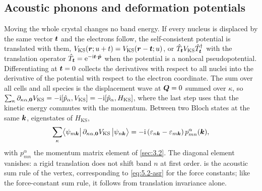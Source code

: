 \subsection{Acoustic phonons and deformation potentials}

Moving the whole crystal changes no band energy. If every nucleus is displaced by the same vector $\bm{t}$ and the electrons follow, the self-consistent potential is translated with them, $V_{\mathrm{KS}}(\bm{r};u + t) = V_{\mathrm{KS}}(\bm{r} - \bm{t};u)$, or $\hat{T}_{\bm{t}}V_{\mathrm{KS}}\hat{T}^\dagger_{\bm{t}}$ with the translation operator $\hat{T}_{\bm{t}} = \mathrm{e}^{-\mathrm{i}\bm{t}\cdot\hat{\bm{p}}}$ when the potential is a nonlocal pseudopotential. Differentiating at $\bm{t} = 0$ collects the derivatives with respect to all nuclei into the derivative of the potential with respect to the electron coordinate. The sum over all cells and all species is the displacement wave at $\bm{Q} = 0$ summed over $\kappa$, so $\sum_\kappa\partial_{\kappa\alpha,\bm{0}}V_{\mathrm{KS}} = -\mathrm{i}[\hat{p}_\alpha, V_{\mathrm{KS}}] = -\mathrm{i}[\hat{p}_\alpha, H_{\mathrm{KS}}]$, where the last step uses that the kinetic energy commutes with the momentum. Between two Bloch states at the same $\bm{k}$, eigenstates of $H_{\mathrm{KS}}$,
\begin{equation}
  \sum_\kappa\bigl\langle\psi_{m\bm{k}}\bigr|\,\partial_{\kappa\alpha,\bm{0}}V_{\mathrm{KS}}\,\bigl|\psi_{n\bm{k}}\bigr\rangle
  = -\mathrm{i}\,(\varepsilon_{n\bm{k}} - \varepsilon_{m\bm{k}})\,p^\alpha_{mn}(\bm{k}) ,
  \label{eq:6.2-asr}
\end{equation}
with $p^\alpha_{mn}$ the momentum matrix element of \cref{sec:3.2}. The diagonal element vanishes: a rigid translation does not shift band $n$ at first order.  is the acoustic sum rule of the vertex, corresponding to \cref{eq:5.2-asr} for the force constants; like the force-constant sum rule, it follows from translation invariance alone.

